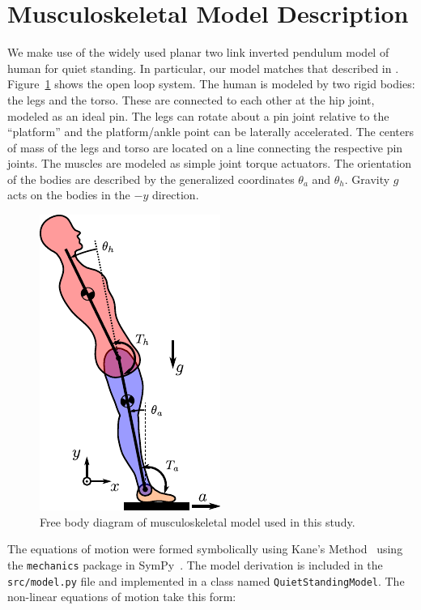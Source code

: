 \documentclass{article}
\begin{document}
\section{Musculoskeletal Model Description}
%
We make use of the widely used planar two link inverted pendulum model of human
for quiet standing. In particular, our model matches that described in
\cite{Park2004}. Figure~\ref{fig:free-body-diagram} shows the open loop system.
The human is modeled by two rigid bodies: the legs and the torso. These are
connected to each other at the hip joint, modeled as an ideal pin. The legs can
rotate about a pin joint relative to the ``platform'' and the platform/ankle
point can be laterally accelerated. The centers of mass of the legs and torso
are located on a line connecting the respective pin joints. The muscles are
modeled as simple joint torque actuators. The orientation of the bodies are
described by the generalized coordinates $\theta_a$ and $\theta_h$. Gravity $g$
acts on the bodies in the $-y$ direction.
%
\begin{figure}
  \centering
  \includegraphics{figures/free-body-diagram.pdf}
  \caption{Free body diagram of musculoskeletal model used in this study.}
  \label{fig:free-body-diagram}
\end{figure}

The equations of motion were formed symbolically using Kane's
Method~\cite{Kane1985} using the \verb|mechanics| package in
SymPy~\cite{Gede2013}. The model derivation is included in the
\verb|src/model.py| file and implemented in a class named
\verb|QuietStandingModel|. The non-linear equations of motion take this form:
\begin{equation}
  
\end{equation}
\end{document}
